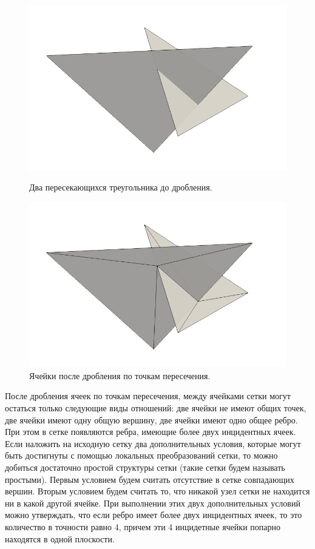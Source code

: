 \begin{figure}[h]
  \centering
  \begin{minipage}[h]{0.4\textwidth}
    \includegraphics[width=\textwidth]{pics/pic_before_cut.png}
    \caption{Два пересекающихся треугольника до дробления.}\label{fig:pic_before_cut}
  \end{minipage}
  \begin{minipage}[h]{0.4\textwidth}
    \includegraphics[width=\textwidth]{pics/pic_after_cut.png}
    \caption{Ячейки после дробления по точкам пересечения.}\label{fig:pic_after_cut}
  \end{minipage}
\end{figure}

После дробления ячеек по точкам пересечения, между ячейками сетки могут остаться только следующие виды отношений: две ячейки не имеют общих точек, две ячейки имеют одну общую вершину, две ячейки имеют одно общее ребро.
При этом в сетке появляются ребра, имеющие более двух инцидентных ячеек.
Если наложить на исходную сетку два дополнительных условия, которые могут быть достигнуты с помощью локальных преобразований сетки, то можно добиться достаточно простой структуры сетки (такие сетки будем называть простыми).
Первым условием будем считать отсутствие в сетке совпадающих вершин.
Вторым условием будем считать то, что никакой узел сетки не находится ни в какой другой ячейке.
При выполнении этих двух дополнительных условий можно утверждать, что если ребро имеет более двух инцидентных ячеек, то это количество в точности равно 4, причем эти 4 инцидетные ячейки попарно находятся в одной плоскости.

